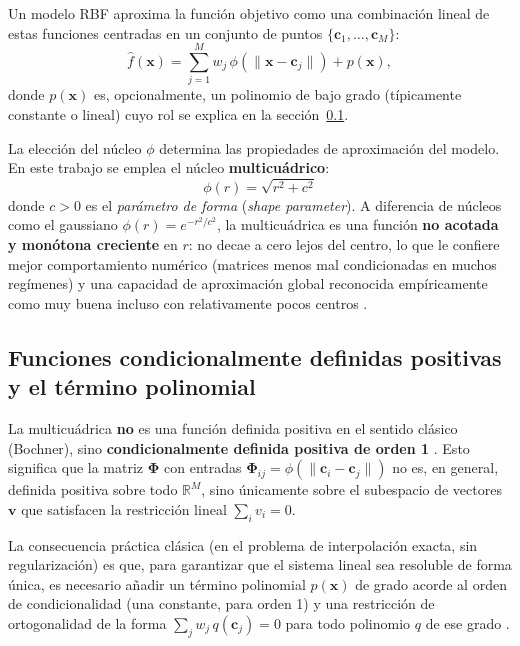 \documentclass[11pt,a4paper]{article}
\newcommand{\R}{\mathbb{R}}
\newcommand{\Phimat}{\boldsymbol{\Phi}}
\begin{document}
Un modelo RBF aproxima la funci\'on objetivo como una combinaci\'on lineal de
estas funciones centradas en un conjunto de puntos $\{\mathbf{c}_1, \dots,
\mathbf{c}_M\}$:
\[
\hat f(\mathbf{x}) = \sum_{j=1}^{M} w_j\, \phi\!\left(\lVert \mathbf{x} -
\mathbf{c}_j \rVert\right) + p(\mathbf{x}),
\]
donde $p(\mathbf{x})$ es, opcionalmente, un polinomio de bajo grado (t\'ipicamente
constante o lineal) cuyo rol se explica en la secci\'on~\ref{subsec:cpd}.

La elecci\'on del n\'ucleo $\phi$ determina las propiedades de aproximaci\'on
del modelo. En este trabajo se emplea el n\'ucleo \textbf{multicu\'adrico}:
\[
\boxed{\; \phi(r) = \sqrt{r^2 + c^2} \;}
\]
donde $c > 0$ es el \emph{par\'ametro de forma} (\emph{shape parameter}).
A diferencia de n\'ucleos como el gaussiano $\phi(r) = e^{-r^2/c^2}$, la
multicu\'adrica es una funci\'on \textbf{no acotada y mon\'otona creciente} en
$r$: no decae a cero lejos del centro, lo que le confiere mejor comportamiento
num\'erico (matrices menos mal condicionadas en muchos reg\'imenes) y una
capacidad de aproximaci\'on global reconocida emp\'iricamente como muy buena
incluso con relativamente pocos centros \cite{buhmann2003,hardy1971,franke1982}.

\subsection{Funciones condicionalmente definidas positivas y el t\'ermino
polinomial}
\label{subsec:cpd}

La multicu\'adrica \textbf{no} es una funci\'on definida positiva en el sentido
cl\'asico (Bochner), sino \textbf{condicionalmente definida positiva de orden
1} \cite{micchelli1986}. Esto significa que la matriz $\Phimat$ con entradas
$\Phimat_{ij} = \phi(\lVert \mathbf{c}_i - \mathbf{c}_j\rVert)$ no es, en
general, definida positiva sobre todo $\R^M$, sino \'unicamente sobre el
subespacio de vectores $\mathbf{v}$ que satisfacen la restricci\'on lineal
$\sum_i v_i = 0$.

La consecuencia pr\'actica cl\'asica (en el problema de interpolaci\'on exacta,
sin regularizaci\'on) es que, para garantizar que el sistema lineal sea
resoluble de forma \'unica, es necesario a\~nadir un t\'ermino polinomial
$p(\mathbf{x})$ de grado acorde al orden de condicionalidad (una constante,
para orden 1) y una restricci\'on de ortogonalidad de la forma
$\sum_j w_j\, q(\mathbf{c}_j) = 0$ para todo polinomio $q$ de ese grado
\cite{micchelli1986,buhmann2003}.
\end{document}
